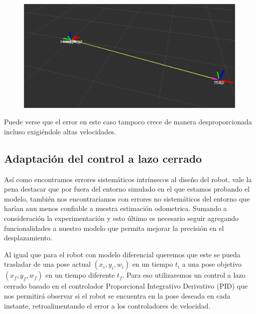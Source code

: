 \begin{figure}[!htb]
\includegraphics[width=\linewidth]{pruebasOdom/3Vueltas2Vel.png}
\end{figure}

Puede verse que el error en este caso tampoco crece de manera desproporcionada incluso exigiéndole altas velocidades.



\subsection{Adaptación del control a lazo cerrado}

Así como encontramos errores sistemáticos intrínsecos al diseño del robot, vale la pena destacar que por fuera del entorno simulado en el que estamos probando el modelo, también nos encontraríamos con errores no sistemáticos del entorno que harían aun menos confiable a nuestra estimación odometrica. Sumando a consideración la experimentación y esto último es necesario seguir agregando funcionalidades a nuestro modelo que permita mejorar la precisión en el desplazamiento. 

Al igual que para el robot con modelo diferencial queremos que este se pueda trasladar de una pose actual $(x_i,y_i,w_i)$ en un tiempo $t_i$ a una pose objetivo $(x_f,y_f,w_f)$ en un tiempo diferente $t_f$. Para eso utilizaremos un control a lazo cerrado basado en el controlador Proporcional Integrativo Derivativo (PID) que nos permitirá observar si el robot se encuentra en la pose deseada en cada instante, retroalimentando el error a los controladores de velocidad.

